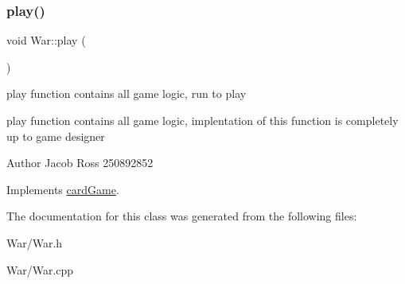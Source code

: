 \subsubsection{\texorpdfstring{play()}{play()}}
{\footnotesize\ttfamily void War\+::play (\begin{DoxyParamCaption}{ }\end{DoxyParamCaption})\hspace{0.3cm}{\ttfamily [virtual]}}



play function contains all game logic, run to play 

play function contains all game logic, implentation of this function is completely up to game designer \begin{DoxyAuthor}{Author}
Jacob Ross 250892852 
\end{DoxyAuthor}


Implements \hyperlink{classcardGame_ae8e04249f37f61e3adfa03cfbad3b021}{card\+Game}.



The documentation for this class was generated from the following files\+:\begin{DoxyCompactItemize}
\item 
War/War.\+h\item 
War/War.\+cpp\end{DoxyCompactItemize}
